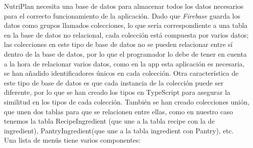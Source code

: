 \documentclass[12pt,a4paper]{report} %
\begin{document}
	NutriPlan necesita una base de datos para almacenar todos los datos necesarios para el correcto funcionamiento de la aplicación. Dado que \textit{Firebase} guarda los datos como grupos llamados colecciones, lo que sería correspondiente a una tabla en la base de datos no relacional, cada colección está compuesta por varios datos; las colecciones en este tipo de base de datos no se pueden relacionar entre sí dentro de la base de datos, por lo que el programador lo debe de tener en cuenta a la hora de relacionar varios datos, como en la app esta aplicación es necesaria, se han añadido identificadores únicos en cada colección. Otra característica de este tipo de base de datos es que cada instancia de la colección puede ser diferente, por lo que se han creado los tipos en TypeScript para asegurar la similitud en los tipos de cada colección.
	También se han creado colecciones unión, que unen dos tablas para que se relacionen entre ellas, como en nuestro caso tenemos la tabla RecipeIngredient (que une a la tabla recipe con la de ingredient), PantryIngredient(que une a la tabla ingredient con Pantry), etc.
	\\
	Una lista de menús tiene varios componentes:
	
\end{document}
